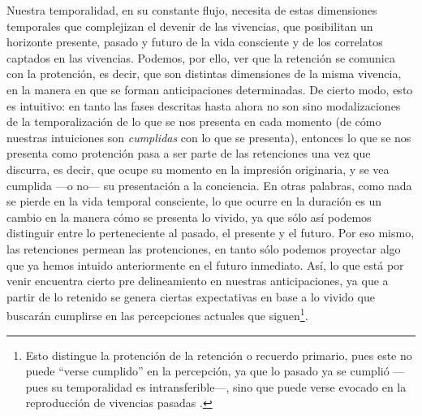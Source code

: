 Nuestra temporalidad, en su constante flujo, necesita de estas
dimensiones temporales que complejizan el devenir de las vivencias, que
posibilitan un horizonte presente, pasado y futuro de la vida consciente
y de los correlatos captados en las vivencias. Podemos, por ello, ver
que la retención se comunica con la protención, es decir, que son
distintas dimensiones de la misma vivencia, en la manera en que se
forman anticipaciones determinadas. De cierto modo, esto es intuitivo:
en tanto las fases descritas hasta ahora no son sino modalizaciones de
la temporalización de lo que se nos presenta en cada momento (de cómo
nuestras intuiciones son \emph{cumplidas} con lo que se presenta),
entonces lo que se nos presenta como protención pasa a ser parte de las
retenciones una vez que discurra, es decir, que ocupe su momento en la
impresión originaria, y se vea cumplida ---o no--- su presentación a la
conciencia. En otras palabras, como nada se pierde en la vida temporal
consciente, lo que ocurre en la duración es un cambio en la manera cómo
se presenta lo vivido, ya que sólo así podemos distinguir entre lo
perteneciente al pasado, el presente y el futuro. Por eso mismo, las
retenciones permean las protenciones, en tanto sólo podemos proyectar
algo que ya hemos intuido anteriormente en el futuro inmediato. Así, lo
que está por venir encuentra cierto pre delineamiento en nuestras
anticipaciones, ya que a partir de lo retenido se genera ciertas
expectativas en base a lo vivido que buscarán cumplirse en las
percepciones actuales que siguen\footnote{Esto distingue la protención
  de la retención o recuerdo primario, pues este no puede ``verse
  cumplido'' en la percepción, ya que lo pasado ya se cumplió ---pues su
  temporalidad es intransferible---, sino que puede verse evocado en la
  reproducción de vivencias pasadas \cite[§26, p.~77]{husserl2002}.}.

